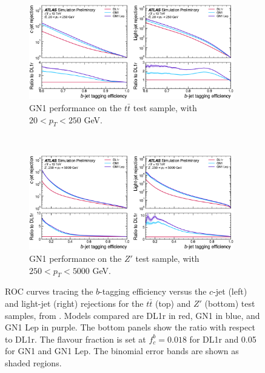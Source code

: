 \begin{figure}[h!]
  \centering
  \begin{subfigure}[b]{0.98\textwidth}
      \centering
      \includegraphics[width=0.98\textwidth]{Images/FTAG/GN/GN1/ROC/ttb.png}
      \caption{GN1 performance on the $t\bar{t}$ test sample, with $20 < p_T < 250$ GeV.} 
      \label{fig:GN1ttb}
  \end{subfigure}\\
  \begin{subfigure}[b]{0.98\textwidth}
    \centering %
      \includegraphics[width=0.98\textwidth]{Images/FTAG/GN/GN1/ROC/zpb.png}
      \caption{GN1 performance on the $Z'$ test sample, with $250 < p_T < 5000$ GeV.} 
      \label{fig:GN1zpb}
  \end{subfigure}
  \caption{ROC curves tracing the $b$-tagging efficiency versus the $c$-jet (left) and light-jet (right) rejections for the $t\bar{t}$ (top) and $Z'$ (bottom) test samples, from \cite{ATL-PHYS-PUB-2022-027}. Models compared are DL1r in red, GN1 in blue, and GN1 Lep in purple. The bottom panels show the ratio with respect to DL1r. The flavour fraction is set at $f^b_c = 0.018$ for DL1r and 0.05 for GN1 and GN1 Lep. The binomial error bands are shown as shaded regions.}
  \label{fig:GN1rocb}
\end{figure} 

